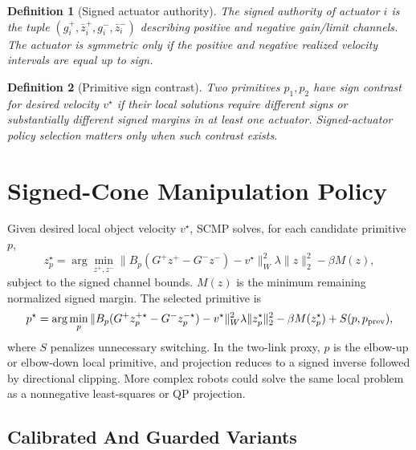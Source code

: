 \documentclass{article}
\newtheorem{definition}{Definition}
\begin{document}
\begin{definition}[Signed actuator authority]
The signed authority of actuator $i$ is the tuple $(g_i^+,\bar z_i^+,g_i^-,\bar z_i^-)$ describing positive and negative gain/limit channels. The actuator is symmetric only if the positive and negative realized velocity intervals are equal up to sign.
\end{definition}

\begin{definition}[Primitive sign contrast]
Two primitives $p_1,p_2$ have sign contrast for desired velocity $v^\star$ if their local solutions require different signs or substantially different signed margins in at least one actuator. Signed-actuator policy selection matters only when such contrast exists.
\end{definition}

\section{Signed-Cone Manipulation Policy}

Given desired local object velocity $v^\star$, SCMP solves, for each candidate primitive $p$,
\begin{equation}
z_p^\star =
\arg\min_{z^+,z^-}
\|B_p(G^+z^+-G^-z^-)-v^\star\|_W^2
\lambda\|z\|_2^2
-\beta M(z),
\end{equation}
subject to the signed channel bounds. $M(z)$ is the minimum remaining normalized signed margin. The selected primitive is
\begin{equation}
p^\star = \arg\min_p
\|B_p(G^+z_p^{+\star}-G^-z_p^{-\star})-v^\star\|_W^2
\lambda\|z_p^\star\|_2^2
-\beta M(z_p^\star)
 + S(p,p_{\rm prev}),
\end{equation}
where $S$ penalizes unnecessary switching. In the two-link proxy, $p$ is the elbow-up or elbow-down local primitive, and projection reduces to a signed inverse followed by directional clipping. More complex robots could solve the same local problem as a nonnegative least-squares or QP projection.

\subsection{Calibrated And Guarded Variants}
\end{document}
